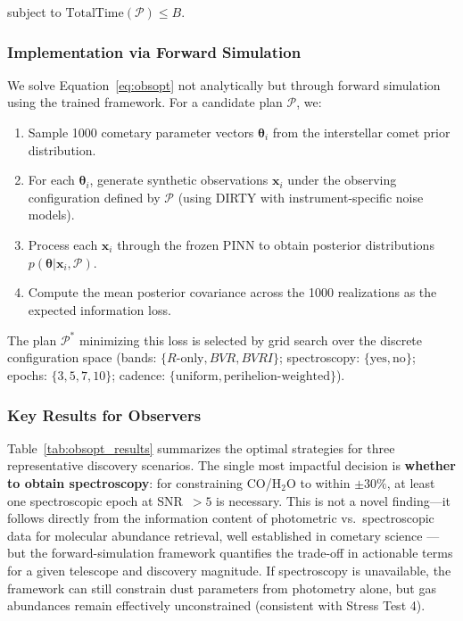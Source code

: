 \documentclass[usenatbib]{mnras}
\begin{document}
subject to $\text{TotalTime}(\mathcal{P}) \leq B$.

\subsubsection{Implementation via Forward Simulation}

We solve Equation~\ref{eq:obsopt} not analytically but through forward simulation using the trained framework. For a candidate plan $\mathcal{P}$, we:

\begin{enumerate}
    \item Sample 1000 cometary parameter vectors $\boldsymbol{\theta}_i$ from the interstellar comet prior distribution.
    \item For each $\boldsymbol{\theta}_i$, generate synthetic observations $\mathbf{x}_i$ under the observing configuration defined by $\mathcal{P}$ (using DIRTY with instrument-specific noise models).
    \item Process each $\mathbf{x}_i$ through the frozen PINN to obtain posterior distributions $p(\boldsymbol{\theta} | \mathbf{x}_i, \mathcal{P})$.
    \item Compute the mean posterior covariance across the 1000 realizations as the expected information loss.
\end{enumerate}

The plan $\mathcal{P}^*$ minimizing this loss is selected by grid search over the discrete configuration space (bands: $\{R\text{-only}, BVR, BVRI\}$; spectroscopy: $\{\text{yes}, \text{no}\}$; epochs: $\{3, 5, 7, 10\}$; cadence: $\{\text{uniform}, \text{perihelion-weighted}\}$).

\subsubsection{Key Results for Observers}

Table~\ref{tab:obsopt_results} summarizes the optimal strategies for three representative discovery scenarios. The single most impactful decision is \textbf{whether to obtain spectroscopy}: for constraining CO/H$_2$O to within $\pm 30\%$, at least one spectroscopic epoch at SNR~$>5$ is necessary. This is not a novel finding---it follows directly from the information content of photometric vs.\ spectroscopic data for molecular abundance retrieval, well established in cometary science \citep{bockelee04}---but the forward-simulation framework quantifies the trade-off in actionable terms for a given telescope and discovery magnitude. If spectroscopy is unavailable, the framework can still constrain dust parameters from photometry alone, but gas abundances remain effectively unconstrained (consistent with Stress Test 4).
\end{document}
